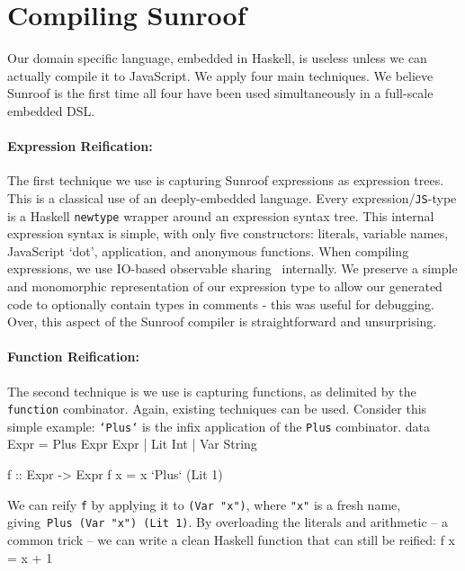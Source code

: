 \documentclass{llncs}
\newcommand{\Src}[1]{{\tt{#1}}}
\newenvironment{Code}{\verbatim}{\endverbatim}
\begin{document}

\section{Compiling Sunroof}
\label{sec:compiler}

Our domain specific language, embedded in Haskell, is useless unless
we can actually compile it to JavaScript. We apply four main techniques.
We believe Sunroof is the first time all four have been used simultaneously
in a full-scale embedded DSL.

\paragraph{Expression Reification:}
The first technique we use is capturing Sunroof expressions as expression trees. 
This is a classical use of an deeply-embedded language. Every expression/\Src{JS}-type
is a Haskell \Src{newtype} wrapper around an expression syntax tree.
This internal expression syntax is simple, with only five constructors:
literals, variable names, JavaScript `dot', application, and anonymous functions.
When compiling expressions, we use IO-based observable sharing~\cite{...} internally.
We preserve a simple and monomorphic representation of our expression
type to allow our generated code to optionally contain types in comments -
this was useful for debugging.
Over, this aspect of the Sunroof compiler is straightforward and unsurprising.

\paragraph{Function Reification:}
The second technique is we use is capturing functions, as delimited
by the \Src{function} combinator. Again, existing techniques can be used.
Consider this simple example: \Src{`Plus`} is the infix application of
the \Src{Plus} combinator.
\begin{Code}
data Expr = Plus Expr Expr | Lit Int | Var String

f :: Expr -> Expr
f x = x `Plus` (Lit 1)
\end{Code}

We can reify \Src{f} by applying it to \Src{(Var "x")}, where \Src{"x"} is a fresh name,
giving~\Src{Plus (Var "x") (Lit 1)}. By overloading the literals and arithmetic -- 
a common trick -- we can write a clean Haskell function that can still be reified:
\begin{Code}
f  x = x + 1
\end{Code}
\end{document}
